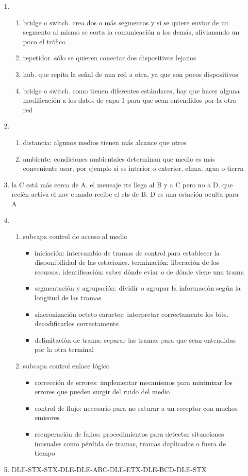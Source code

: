 \documentclass[11pt]{article}
\begin{document}
\begin{enumerate}
\item \begin{enumerate}
\item bridge o switch. crea dos o más segmentos y si se quiere enviar de un segmento al mismo se corta la comunicación a los demás, alivianando un poco el tráfico
\item repetidor. sólo se quieren conectar dos dispositivos lejanos
\item hub. que repita la señal de una red a otra, ya que son pocos dispositivos
\item bridge o switch. como tienen diferentes estándares, hay que hacer alguna modificación a los datos de capa 1 para que sean entendidos por la otra red
\end{enumerate}
\item \begin{enumerate}
\item distancia: algunos medios tienen más alcance que otros
\item ambiente: condiciones ambientales determinan que medio es más conveniente usar, por ejemplo si es interior o exterior, clima, agua o tierra
\end{enumerate}
\item la C está más cerca de A. el mensaje rts llega al B y a C pero no a D, que recién activa el nav cuando recibe el cts de B. D es una estación oculta para A
\item \begin{enumerate}
\item subcapa control de acceso al medio
\begin{itemize}
\item iniciación: intercambio de tramas de control para establecer la disponibilidad de las estaciones. terminación: liberación de los recursos. identificación: saber dónde eviar o de dónde viene una trama
\item segmentación y agrupación: dividir o agrupar la información según la longitud de las tramas
\item sincronización octeto caracter: interpretar correctamente los bits. decodificarlos correctamente
\item delimitación de trama: separar las tramas para que sean entendidas por la otra terminal
\end{itemize}
\item subcapa control enlace lógico
\begin{itemize}
\item corrección de errores: implementar mecanismos para minimizar los errores que pueden surgir del ruido del medio
\item control de flujo: necesario para no saturar a un receptor con muchos emisores
\item recuperación de fallos: procedimientos para detectar situaciones inusuales como pérdida de tramas, tramas duplicadas o fuera de tiempo
\end{itemize}
\end{enumerate}
\item DLE-STX-STX-DLE-DLE-ABC-DLE-ETX-DLE-BCD-DLE-STX


\end{enumerate}
\end{document}
